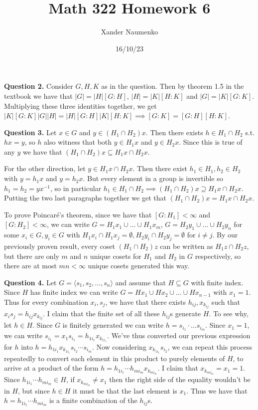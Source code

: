 \documentclass[letterpaper, reqno,11pt]{article}
\begin{document}
\title{Math 322 Homework 6}
\date{16/10/23}
\author{Xander Naumenko}
\maketitle

{\medskip\noindent\bf Question 2.} Consider $G,H,K$ as in the question. Then by theorem 1.5 in the textbook we have that $|G|=|H|[G:H]$, $|H|=|K|[H:K]$ and $|G|=|K|[G:K]$. Multiplying these three identities together, we get $|K|[G:K]|G||H|=|H|[G:H]|K|[H:K]\implies[G:K]=[G:H][H:K]$.

{\medskip\noindent\bf Question 3.} Let $x\in G$ and $y\in (H_1\cap H_2)x$. Then there exists $h\in H_1\cap H_2$ s.t. $hx=y$, so $h$ also witness that both $y\in H_1 x$ and $y\in H_2x$. Since this is true of any $y$ we have that $(H_1\cap H_2)x\subseteq H_1x\cap H_2 x$.

For the other direction, let $y\in H_1x\cap H_2x$. Then there exist $h_1\in H_1,h_2\in H_2$ with $y=h_1x$ and $y=h_2x$. But every element in a group is invertible so $h_1=h_2=yx^{-1}$, so in particular $h_1\in H_1\cap H_2\implies(H_1\cap H_2)x\supseteq H_1x\cap H_2 x$. Putting the two last paragraphs together we get that $(H_1\cap H_2)x= H_1x\cap H_2 x$.

To prove Poincar\'e's theorem, since we have that $[G:H_1]<\infty$ and $[G:H_2]<\infty$, we can write $G=H_1x_1\cup\ldots\cup H_1 x_m$, $G=H_2y_1\cup\ldots\cup H_2 y_n$ for some $x_i\in G, y_i\in G$ with $H_1x_i\cap H_1x_j=\emptyset,H_2y_i\cap H_2y_j=\emptyset$ for $i\neq j$. By our previously proven result, every coset $(H_1\cap H_2)z$ can be written as $H_1z\cap H_2z$, but there are only $m$ and $n$ unique cosets for $H_1$ and $H_2$ in $G$ respectively, so there are at most $mn<\infty$ unique cosets generated this way.

{\medskip\noindent\bf Question 4.} Let $G= \langle s_1,s_2,\ldots, s_n\rangle$ and assume that $H\subseteq G$ with finite index. Since $H$ has finite index we can write $G=H x_1 \cup H x_2\cup \ldots\cup H x_{n-1}$ with $x_1=1$. Thus for every combination $x_i,s_j$, we have that there exists $h_{ij},x_{k_{ij}}$ such that $x_i s_j=h_{ij}x_{k_{ij}}$. I claim that the finite set of all these $h_{ij}$s generate $H$. To see why, let $h\in H$. Since $G$ is finitely generated we can write $h=s_{i_1}\cdot\ldots s_{i_m}$. Since $x_1=1$, we can write $s_{i_1}=x_1s_{i_1}=h_{1i_{1}}x_{k_{1i_1}}$. We've thus converted our previous expression for $h$ into $h=h_{1i_1}x_{k_{1i_1}}s_{i_2}\cdots s_{i_m}$. Now considering $x_{k_{1i_1}}s_{i_2}$, we can repeat this process repeatedly to convert each element in this product to purely elements of $H$, to arrive at a product of the form $h=h_{1i_1}\cdots h_{mi_m}x_{k_{mi_m}}$. I claim that $x_{k_{mi_m}}=x_1=1$. Since $h_{1i_1}\cdots h_{mi_m}\in H$, if $x_{k_{mi_m}}\neq x_1$ then the right side of the equality wouldn't be in $H$, but since $h\in H$ it must be that the last element is $x_1$. Thus we have that $h=h_{1i_1}\cdots h_{mi_m}$ is a finite combination of the $h_{ij}$s.
\end{document}
